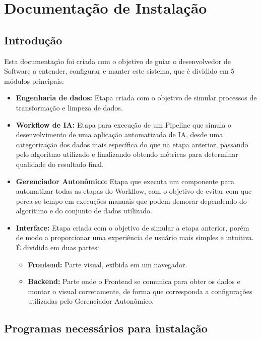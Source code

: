 \documentclass[portugues]{ic-tese}
\begin{document}



\appendix
\chapter{Documentação de Instalação}
\label{ann:DocInstall}

\section{Introdução}

Esta documentação foi criada com o objetivo de guiar o desenvolvedor de Software a entender, configurar e manter este sistema, que é dividido em 5 módulos principais:

\begin{itemize}
    \item {\textbf{Engenharia de dados:}} Etapa criada com o objetivo de simular processos de transformação e limpeza de dados.
    \item {\textbf{Workflow de IA:}} Etapa para execução de um Pipeline que simula o desenvolvimento de uma aplicação automatizada de IA, desde uma categorização dos dados mais específica do que na etapa anterior, passando pelo algoritmo utilizado e finalizando obtendo métricas para determinar qualidade do resultado final.
    \item {\textbf{Gerenciador Autonômico:}} Etapa que executa um componente para automatizar todas as etapas do Workflow, com o objetivo de evitar com que perca-se tempo em execuções manuais que podem demorar dependendo do algoritimo e do conjunto de dados utilizado.
    \item {\textbf{Interface:}} Etapa criada com o objetivo de simular a etapa anterior, porém de modo a proporcionar uma experiência de usuário mais simples e intuitiva. É dividida em duas partes:
    \begin{itemize}
        \item {\textbf{Frontend:}} Parte visual, exibida em um navegador.
        \item \textbf{{Backend:}} Parte onde o Frontend se comunica para obter os dados e montar o visual corretamente, de forma que corresponda a configurações utilizadas pelo Gerenciador Autonômico.
    \end{itemize}
\end{itemize}

\section{Programas necessários para instalação}
\end{document}
